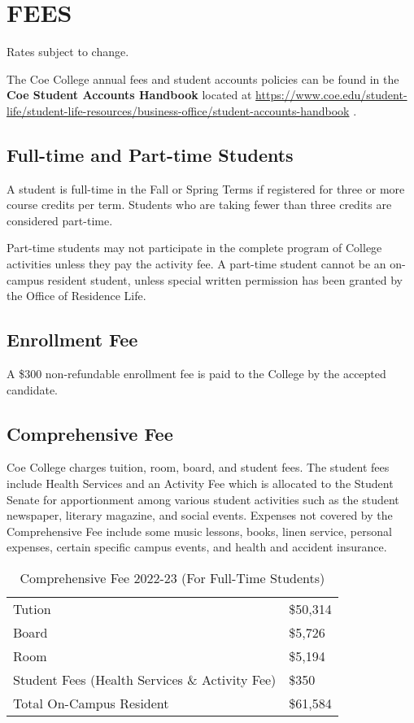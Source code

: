 \documentclass[
  letterpaper,
]{scrbook}
\renewcommand\toprule[2]\relax
\renewcommand\bottomrule[2]\relax
\begin{document}
\section{FEES}\label{fees}

Rates subject to change.

The Coe College annual fees and student accounts policies can be found
in the \textbf{Coe Student Accounts Handbook} located at
\url{https://www.coe.edu/student-life/student-life-resources/business-office/student-accounts-handbook}
.

\subsection{Full-time and Part-time
Students}\label{full-time-and-part-time-students}

A student is full-time in the Fall or Spring Terms if registered for
three or more course credits per term. Students who are taking fewer
than three credits are considered part-time.

Part-time students may not participate in the complete program of
College activities unless they pay the activity fee. A part-time student
cannot be an on-campus resident student, unless special written
permission has been granted by the Office of Residence Life.

\subsection{Enrollment Fee}\label{enrollment-fee}

A \$300 non-refundable enrollment fee is paid to the College by the
accepted candidate.

\subsection{Comprehensive Fee}\label{comprehensive-fee}

Coe College charges tuition, room, board, and student fees. The student
fees include Health Services and an Activity Fee which is allocated to
the Student Senate for apportionment among various student activities
such as the student newspaper, literary magazine, and social events.
Expenses not covered by the Comprehensive Fee include some music
lessons, books, linen service, personal expenses, certain specific
campus events, and health and accident insurance.

\begin{longtable}[]{@{}
  >{\raggedright\arraybackslash}p{}
  >{\raggedleft\arraybackslash}p{}@{}}
\caption{Comprehensive Fee 2022-23 (For Full-Time
Students)}\tabularnewline
\toprule\noalign{}
\endfirsthead
\endhead
\bottomrule\noalign{}
\endlastfoot
Tution & \$50,314 \\
Board & \$5,726 \\
Room & \$5,194 \\
Student Fees (Health Services \& Activity Fee) & \$350 \\
Total On-Campus Resident & \$61,584 \\
\end{longtable}
\end{document}

